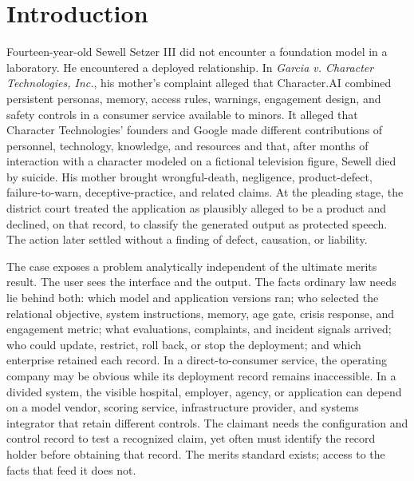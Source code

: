 \section*{Introduction}
Fourteen-year-old Sewell Setzer III did not encounter a foundation model in a laboratory. He encountered a deployed relationship. In \emph{Garcia v. Character Technologies, Inc.}, his mother's complaint alleged that Character.AI combined persistent personas, memory, access rules, warnings, engagement design, and safety controls in a consumer service available to minors. It alleged that Character Technologies' founders and Google made different contributions of personnel, technology, knowledge, and resources and that, after months of interaction with a character modeled on a fictional television figure, Sewell died by suicide. His mother brought wrongful-death, negligence, product-defect, failure-to-warn, deceptive-practice, and related claims. At the pleading stage, the district court treated the application as plausibly alleged to be a product and declined, on that record, to classify the generated output as protected speech. The action later settled without a finding of defect, causation, or liability.

The case exposes a problem analytically independent of the ultimate merits result. The user sees the interface and the output. The facts ordinary law needs lie behind both: which model and application versions ran; who selected the relational objective, system instructions, memory, age gate, crisis response, and engagement metric; what evaluations, complaints, and incident signals arrived; who could update, restrict, roll back, or stop the deployment; and which enterprise retained each record. In a direct-to-consumer service, the operating company may be obvious while its deployment record remains inaccessible. In a divided system, the visible hospital, employer, agency, or application can depend on a model vendor, scoring service, infrastructure provider, and systems integrator that retain different controls. The claimant needs the configuration and control record to test a recognized claim, yet often must identify the record holder before obtaining that record. The merits standard exists; access to the facts that feed it does not.

